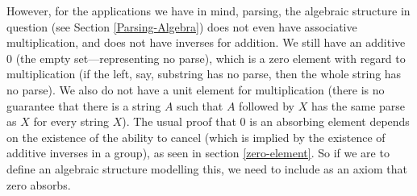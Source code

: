 However, for the applications we have in mind, parsing, the algebraic structure in question (see Section \ref{Parsing-Algebra}) does not even have associative multiplication, and does not have inverses for addition. We still have an additive $0$ (the empty set---representing no parse), which is a zero element with regard to multiplication (if the left, say, substring has no parse, then the whole string has no parse). We also do not have a unit element for multiplication (there is no guarantee that there is a string $A$ such that $A$ followed by $X$ has the same parse as $X$ for every string $X$). The usual proof that $0$ is an absorbing element depends on the existence of the ability to cancel (which is implied by the existence of additive inverses in a group), as seen in section \ref{zero-element}. So if we are to define an algebraic structure modelling this, we need to include as an axiom that zero absorbs.


